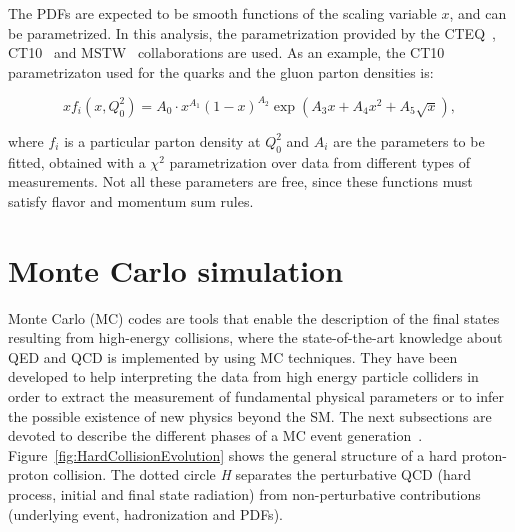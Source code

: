 The PDFs are expected to be smooth functions of the scaling variable $x$, and can be parametrized.
In this analysis, the parametrization provided by the CTEQ~\cite{Lai:1994bb}, CT10~\cite{Lai:2010vv} and MSTW~\cite{Martin:2009iq} collaborations are used.
As an example, the CT10 parametrizaton used for the quarks and the gluon parton densities is:

\begin{equation}
xf_i(x, Q^2_0) = A_0 \cdot x^{A_1}(1-x)^{A_2}\exp{(A_3x + A_4 x^2 + A_5\sqrt{x})},
\label{eq:parametrizationPDF}
\end{equation}

\noindent where $f_i$ is a particular parton density at $Q^2_0$ and $A_i$ are the parameters to be fitted, obtained with a $\chi^2$ parametrization over data from different types of measurements.
Not all these parameters are free, since these functions must satisfy flavor and momentum sum rules.


\section{Monte Carlo simulation}
    \label{sec:MCSimulation}

Monte Carlo (MC) codes are tools that enable the description of the final states resulting from high-energy collisions, where the state-of-the-art knowledge about QED and QCD is implemented by using MC techniques.
They have been developed to help interpreting the data from high energy particle colliders in order to extract the measurement of fundamental physical parameters or to infer the possible existence of new physics beyond the SM.
The next subsections are devoted to describe the different phases of a MC event generation~\cite{Skands:2011pf,ellis2003qcd}.
Figure~\ref{fig:HardCollisionEvolution} shows the general structure of a hard proton-proton collision.
The dotted circle {\em H} separates the perturbative QCD (hard process, initial and final state radiation) from non-perturbative contributions (underlying event, hadronization and PDFs).

